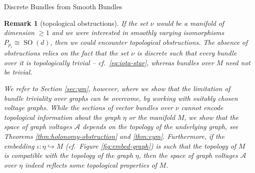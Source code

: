 \documentclass[10pt,reqno]{amsart}
\numberwithin{equation}{section}
\theoremstyle{bfnote}
\theoremstyle{bfdef}
\newtheorem{remark}[theorem]{Remark}
\newcommand{\mc}[1]{\mathcal{#1}}
\DeclareMathOperator{\SO}{SO}
\begin{document}
\begin{subsection}{Discrete Bundles from Smooth Bundles}
	\begin{remark}[topological obstructions]
		If the set $\nu$ would be a manifold of dimension $\geq 1$ and we were interested in smoothly varying isomorphisms $P_{p_i} \cong \SO(d)$, then we could encounter topological obstructions.
		The absence of obstructions relies on the fact that the set $\nu$ is discrete such that every bundle over it is topologically trivial -- cf.~\eqref{eq:iota-star}, whereas bundles over $M$ need not be trivial. 
		
		We refer to Section \ref{sec:ym}, however, where we show that the limitation of bundle triviality over graphs can be overcome, by working with suitably chosen voltage graphs. While the sections of vector bundles over $\nu$ cannot encode topological information about the graph $\eta$ or the manifold $M$, we show that the space of graph voltages $\mc{A}$ \textit{depends} on the topology of the underlying graph, see Theorems \ref{thm:holonomy-obstruction} and \ref{thm:eym}. Furthermore, if the embedding $\iota: \eta \hookrightarrow M$ (cf.~Figure \ref{fig:embed-graph}) is such that the topology of $M$ is compatible with the topology of the graph $\eta$, then the space of graph voltages $\mc{A}$ over $\eta$ indeed reflects some topological properties of $M$.
	\end{remark}
\end{subsection}
\end{document}
